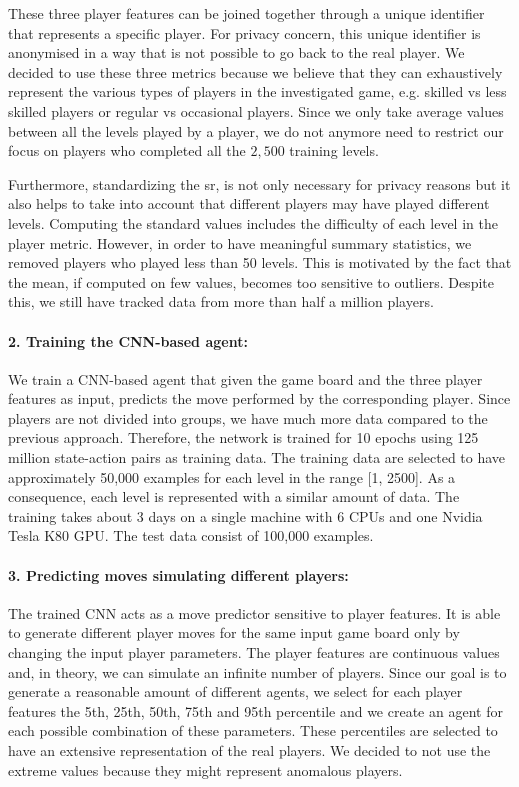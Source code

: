\noindent
These three player features can be joined together through a unique identifier that represents a specific player. For privacy concern, this unique identifier is anonymised in a way that is not possible to go back to the real player. We decided to use these three metrics because we believe that they can exhaustively represent the various types of players in the investigated game, e.g. skilled vs less skilled players or regular vs occasional players. Since we only take average values between all the levels played by a player, we do not anymore need to restrict our focus on players who completed all the $2,500$ training levels. 

Furthermore, standardizing the \acs{sr}, is not only necessary for privacy reasons but it also helps to take into account that different players may have played different levels. Computing the standard values includes the difficulty of each level in the player metric. However, in order to have meaningful summary statistics, we removed players who played less than 50 levels. This is motivated by the fact that the mean, if computed on few values, becomes too sensitive to outliers. Despite this, we still have tracked data from more than half a million players.


\paragraph{2. Training the \acs{CNN}-based agent:}
We train a \acs{CNN}-based agent that given the game board and the three player features as input, predicts the move performed by the corresponding player. Since players are not divided into groups, we have much more data compared to the previous approach. Therefore, the network is trained for 10 epochs using 125 million state-action pairs as training data. The training data are selected to have approximately 50,000 examples for each level in the range [1, 2500]. As a consequence, each level is represented with a similar amount of data. The training takes about 3 days on a single machine with 6 CPUs and one Nvidia Tesla K80 GPU. The test data consist of 100,000 examples.

\paragraph{3. Predicting moves simulating different players:}
The trained \acs{CNN} acts as a move predictor sensitive to player features. It is able to generate different player moves for the same input game board only by changing the input player parameters. The player features are continuous values and, in theory, we can simulate an infinite number of players. Since our goal is to generate a reasonable amount of different agents, we select for each player features the 5th, 25th, 50th, 75th and 95th percentile and we create an agent for each possible combination of these parameters. These percentiles are selected to have an extensive representation of the real players. We decided to not use the extreme values because they might represent anomalous players. 

